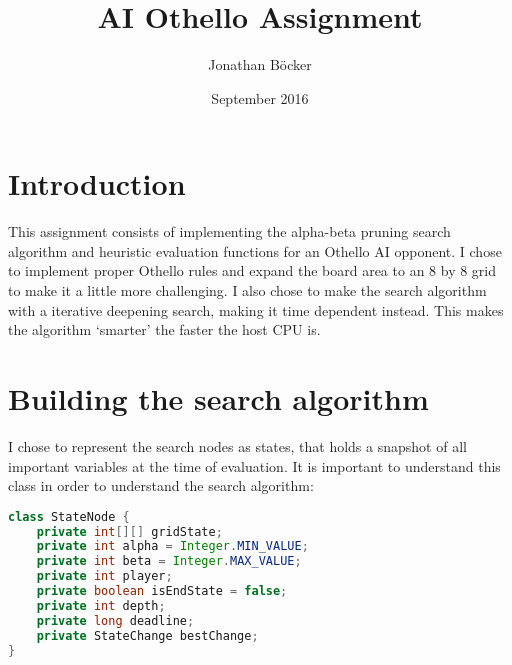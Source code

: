 \documentclass{article}
\title{AI Othello Assignment}
\author{Jonathan Böcker}
\date{September 2016}
\begin{document}
\maketitle

\section{Introduction}
This assignment consists of implementing the alpha-beta pruning search algorithm
and heuristic evaluation functions for an Othello AI opponent. I chose to implement
proper Othello rules and expand the board area to an 8 by 8 grid to make it a little
more challenging. I also chose to make the search algorithm with a iterative deepening search,
making it time dependent instead.
This makes the algorithm `smarter' the faster the host CPU is.

\section{Building the search algorithm}
I chose to represent the search nodes as states, that holds a snapshot of all important
variables at the time of evaluation. It is important to understand this class in order to understand
the search algorithm:

\begin{lstlisting}[language=Java]
class StateNode {
    private int[][] gridState;
    private int alpha = Integer.MIN_VALUE;
    private int beta = Integer.MAX_VALUE;
    private int player;
    private boolean isEndState = false;
    private int depth;
    private long deadline;
    private StateChange bestChange;
}
\end{lstlisting}
\end{document}
